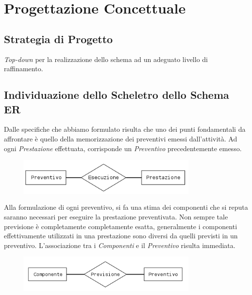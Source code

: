 \section{Progettazione Concettuale}
	
	\subsection{Strategia di Progetto}
		\emph{Top-down} per la realizzazione dello schema ad un adeguato livello di raffinamento. 
						
		{\color{red}{Questa sezione va ampliata e corretta}}
		
	\subsection{Individuazione dello Scheletro dello Schema ER}
		
		Dalle specifiche che abbiamo formulato risulta che uno dei punti fondamentali da affrontare è quello della memorizzazione dei preventivi emessi dall'attività.
		Ad ogni \emph{Prestazione} effettuata, corrisponde un \emph{Preventivo} precedentemente emesso.
		
		\begin{figure}[H]
			\centering
			\includegraphics[width=9cm]{images/diagrams/preventivo_prestazione.png}
		\end{figure}
		
		Alla formulazione di ogni preventivo, si fa una stima dei componenti che si reputa saranno necessari per eseguire la prestazione preventivata. Non sempre tale previsione è completamente completamente esatta, generalmente i componenti effettivamente utilizzati in una prestazione sono diversi da quelli previsti in un preventivo.
		L'associazione tra i \emph{Componenti} e il \emph{Preventivo} risulta immediata.
		
		\begin{figure}[H]
			\centering
			\includegraphics[width=9cm]{images/diagrams/preventivo_componente.png}
		\end{figure}
		
